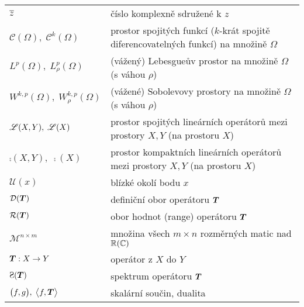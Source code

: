 
\begin{table}[h!]
\begin{tabular}{l|l}
$\overline{z}$
& číslo komplexně sdružené k $z$
\\
$\mathcal{C}(\Omega), \; \mathcal{C}^k(\Omega)$
& prostor spojitých funkcí ($k$-krát spojitě diferencovatelných funkcí) na množině $\Omega$
\\
$L^p(\Omega), \; L^p_\rho(\Omega)$
& (vážený) Lebesgueův prostor na množině $\Omega$ (s váhou $\rho$)
\\
$W^{k,p}(\Omega), \; W^{k,p}_\rho(\Omega)$
& (vážené) Sobolevovy prostory na množině $\Omega$ (s váhou $\rho$)
\\
$\mathscr{L}(X, Y), \; \mathscr{L}(X)$
& prostor spojitých lineárních operátorů mezi prostory $X, Y$ (na prostoru $X$)
\\
$\comp(X, Y), \; \comp(X)$
& prostor kompaktních lineárních operátorů mezi prostory $X, Y$ (na prostoru $X$)
\\
$\mathcal{U}(x)$
& blízké okolí bodu $x$
\\
$\mathcal{D}(\boldsymbol{T})$
& definiční obor operátoru $\boldsymbol{T}$
\\
$\mathcal{R}(\boldsymbol{T})$
& obor hodnot (range) operátoru $\boldsymbol{T}$
\\
$\mathcal{M}^{n\times m}$
& množina všech $m\times n$ rozměrných matic nad $\mathbb{R}(\mathbb{C})$
\\
$\boldsymbol{T}: X \to Y$
& operátor z $X$ do $Y$
\\
$\Sp(\map T)$
& spektrum operátoru $\boldsymbol{T}$
\\
$\big( f, g \big), \; \big< f, \boldsymbol{T} \big>$
& skalární součin, dualita
\end{tabular}
\end{table}